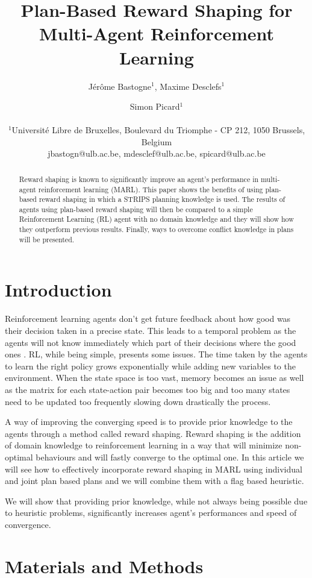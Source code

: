 \documentclass[letterpaper]{article}
\title{Plan-Based Reward Shaping for Multi-Agent Reinforcement Learning}
\author{Jérôme Bastogne$^{1}$, Maxime Desclefs$^{1}$ \and Simon Picard$^{1}$ \\
\mbox{}\\
$^1$Université Libre de Bruxelles, Boulevard du Triomphe - CP 212, 1050 Brussels, Belgium \\
jbastogn@ulb.ac.be, mdesclef@ulb.ac.be, spicard@ulb.ac.be}
\begin{document}
\maketitle

\begin{abstract}
Reward shaping is known to significantly improve an agent’s performance in multi-agent reinforcement
learning (MARL). This paper shows the benefits of using plan-based reward shaping in which a STRIPS planning knowledge is used. The results of agents using plan-based reward shaping will then be compared to a simple Reinforcement Learning (RL) agent with no domain knowledge and they will show how they outperform previous results. Finally, ways to overcome conflict knowledge in plans will be presented.
\end{abstract}

\section{Introduction}

Reinforcement learning agents don't get future feedback about how good was their decision taken in a precise state. This leads to a temporal problem as the agents will not know immediately which part of their decisions where the good ones \citep{rs}. RL, while being simple, presents some issues. The time taken by the agents to learn the right policy grows exponentially while adding new variables to the environment. When the state space is too vast, memory becomes an issue as well as the matrix for each state-action pair becomes too big and too many states need to be updated too frequently slowing down drastically the process. 

A way of improving the converging speed is to provide prior knowledge to the agents through a method called reward shaping. Reward shaping is the addition of domain knowledge to reinforcement learning in a way that will minimize non-optimal behaviours and will fastly converge to the optimal one. In this article we will see how to effectively incorporate reward shaping in MARL using individual and joint plan based plans and we will combine them with a flag based heuristic\citep{paper4}.

We will show that providing prior knowledge, while not always being possible due to heuristic problems, significantly increases agent's performances and speed of convergence.



\section{Materials and Methods}
\end{document}

